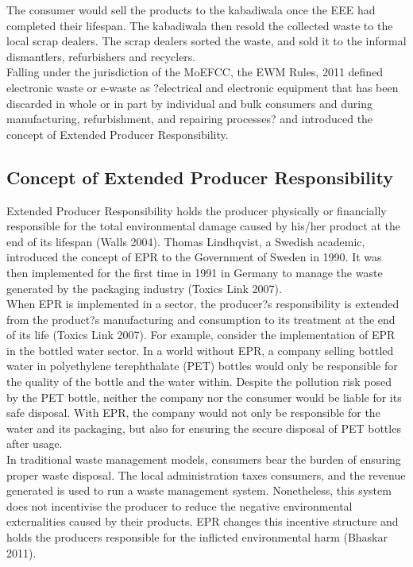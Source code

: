 \documentclass[a4paper, 12pt]{article}
\begin{document}
                    The consumer would sell the products to the kabadiwala once the EEE had completed their lifespan. The kabadiwala then resold the collected waste to the local scrap dealers. The scrap dealers sorted the waste, and sold it to the informal dismantlers, refurbishers and recyclers. \\
                    
                    Falling under the jurisdiction of the MoEFCC, the EWM Rules, 2011 defined electronic waste or e-waste as ?electrical and electronic equipment that has been discarded in whole or in part by individual and bulk consumers and during manufacturing, refurbishment, and repairing processes? and introduced the concept of Extended Producer Responsibility. \\
                    
                    \subsection{Concept of Extended Producer Responsibility}
                    
                    Extended Producer Responsibility holds the producer physically or financially responsible for the total environmental damage caused by his/her product at the end of its lifespan (Walls 2004). Thomas Lindhqvist, a Swedish academic, introduced the concept of EPR to the Government of Sweden in 1990. It was then implemented for the first time in 1991 in Germany to manage the waste generated by the packaging industry (Toxics Link 2007).\\
                    
                    When EPR is implemented in a sector, the producer?s responsibility is extended from the product?s manufacturing and consumption to its treatment at the end of its life (Toxics Link 2007). For example, consider the implementation of EPR in the bottled water sector. In a world without EPR, a company selling bottled water in polyethylene terephthalate (PET) bottles would only be responsible for the quality of the bottle and the water within. Despite the pollution risk posed by the PET bottle, neither the  company nor the consumer would be liable for its safe disposal. With EPR, the company would not only be responsible for the water and its packaging, but also for ensuring the secure disposal of PET bottles after usage. \\
                    
                    In traditional waste management models, consumers bear the burden of ensuring proper waste disposal. The local administration taxes consumers, and the revenue generated is used to run a waste management system. Nonetheless, this system does not incentivise the producer to reduce the negative environmental externalities caused by their products. EPR changes this incentive structure and holds the producers responsible for the inflicted environmental harm (Bhaskar 2011). \\
                    
\end{document}
